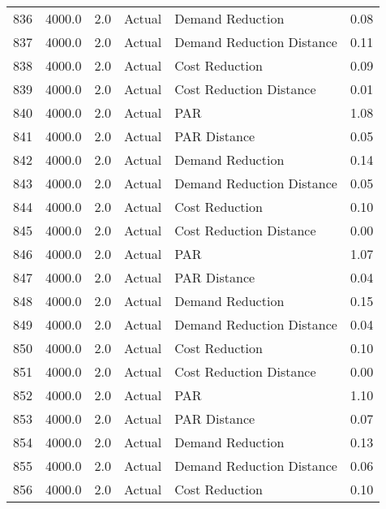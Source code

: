 \begin{longtable}{lrrllr}
836  &       4000.0 &     2.0 &         Actual &           Demand Reduction &   0.08 \\
837  &       4000.0 &     2.0 &         Actual &  Demand Reduction Distance &   0.11 \\
838  &       4000.0 &     2.0 &         Actual &             Cost Reduction &   0.09 \\
839  &       4000.0 &     2.0 &         Actual &    Cost Reduction Distance &   0.01 \\
840  &       4000.0 &     2.0 &         Actual &                        PAR &   1.08 \\
841  &       4000.0 &     2.0 &         Actual &               PAR Distance &   0.05 \\
842  &       4000.0 &     2.0 &         Actual &           Demand Reduction &   0.14 \\
843  &       4000.0 &     2.0 &         Actual &  Demand Reduction Distance &   0.05 \\
844  &       4000.0 &     2.0 &         Actual &             Cost Reduction &   0.10 \\
845  &       4000.0 &     2.0 &         Actual &    Cost Reduction Distance &   0.00 \\
846  &       4000.0 &     2.0 &         Actual &                        PAR &   1.07 \\
847  &       4000.0 &     2.0 &         Actual &               PAR Distance &   0.04 \\
848  &       4000.0 &     2.0 &         Actual &           Demand Reduction &   0.15 \\
849  &       4000.0 &     2.0 &         Actual &  Demand Reduction Distance &   0.04 \\
850  &       4000.0 &     2.0 &         Actual &             Cost Reduction &   0.10 \\
851  &       4000.0 &     2.0 &         Actual &    Cost Reduction Distance &   0.00 \\
852  &       4000.0 &     2.0 &         Actual &                        PAR &   1.10 \\
853  &       4000.0 &     2.0 &         Actual &               PAR Distance &   0.07 \\
854  &       4000.0 &     2.0 &         Actual &           Demand Reduction &   0.13 \\
855  &       4000.0 &     2.0 &         Actual &  Demand Reduction Distance &   0.06 \\
856  &       4000.0 &     2.0 &         Actual &             Cost Reduction &   0.10 \\

\end{longtable}
